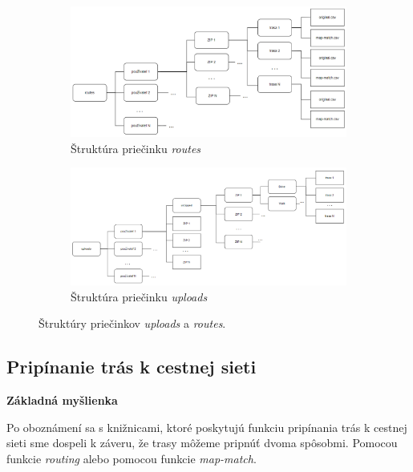 \begin{figure}[H]
    \centering
    \begin{subfigure}{\textwidth}
        \centering
        \includegraphics[width=1\textwidth]{img/struktura priecinkov/routes.png}
        \caption{Štruktúra priečinku \textit{routes}}
        \label{fig:routes-structure}
    \end{subfigure}
    \begin{subfigure}{\textwidth}
        \centering
        \includegraphics[width=1\textwidth]{img/struktura priecinkov/uploads.png}
        \caption{Štruktúra priečinku \textit{uploads}}
        \label{fig:uploads-structure}
    \end{subfigure}
    \caption{Štruktúry priečinkov \textit{uploads} a \textit{routes}.}
    \label{fig:uploads-routes-structure}
\end{figure}


\subsection{Pripínanie trás k cestnej sieti \label{section:pripinanie}}
\textbf{Základná myšlienka}

Po oboznámení sa s knižnicami, ktoré poskytujú funkciu pripínania trás k cestnej sieti sme dospeli k záveru, že trasy môžeme pripnúť dvoma spôsobmi\cite{mapbox}\cite{valhalla}\cite{graphopper}. Pomocou funkcie \textit{routing} alebo pomocou funkcie \textit{map-match}. 

